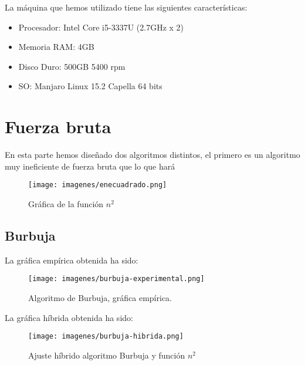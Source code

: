 La máquina que hemos utilizado tiene las siguientes características:
	
\begin{itemize}
		
	\item Procesador: Intel Core i5-3337U (2.7GHz x 2)
	\item Memoria RAM: 4GB
	\item Disco Duro: 500GB 5400 rpm
	\item SO: Manjaro Linux 15.2 Capella 64 bits
\end{itemize}
	



\section{Fuerza bruta} %


En esta parte hemos diseñado dos algoritmos distintos, el primero es un algoritmo muy ineficiente de fuerza bruta que lo que hará 
\begin{figure}[H]
	\centering
	\texttt{[image: imagenes/enecuadrado.png]}
	\caption{Gráfica de la función $n^2$}
	\label{fig:E1}
\end{figure}



\subsection{Burbuja}


La gráfica empírica obtenida ha sido:
\begin{figure}[H]
	\centering
	\texttt{[image: imagenes/burbuja-experimental.png]}
	\caption{Algoritmo de Burbuja, gráfica empírica.}
	\label{fig:E2}
\end{figure}





La gráfica híbrida obtenida ha sido:
\begin{figure}[H]
	\centering
	\texttt{[image: imagenes/burbuja-hibrida.png]}
	\caption{Ajuste híbrido algoritmo Burbuja y función $n^2$}
	\label{fig:E3}
\end{figure}	






